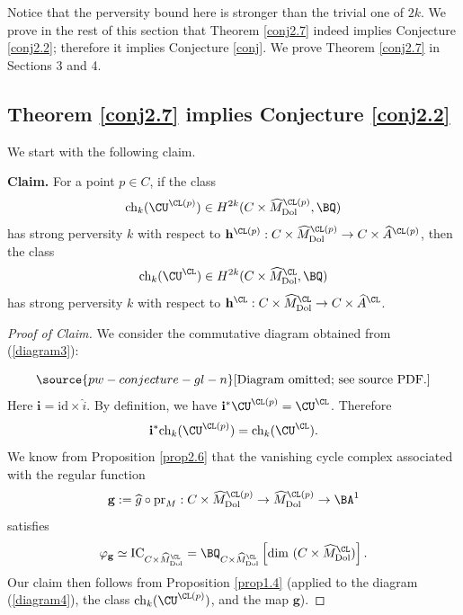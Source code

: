 Notice that the perversity bound here is stronger than the trivial one of $2k$.  We prove in the rest of this section that Theorem \ref{conj2.7} indeed implies Conjecture \ref{conj2.2}; therefore it implies Conjecture \ref{conj}. We prove Theorem \ref{conj2.7} in Sections 3 and 4.


\subsection{Theorem \ref{conj2.7} implies Conjecture \ref{conj2.2}}\label{Sec2.3} We start with the following claim.



 {\bf Claim.} For a point $p\in C$, if the class
\[
\mathrm{ch}_k(\CU^{\CL(p)}) \in H^{2k}(C\times \widehat{M}^{\CL(p)}_{\mathrm{Dol}}, \BQ)
\]
has strong perversity $k$ with respect to $\mathbf{h}^{\CL(p)}: C\times \widehat{M}^{\CL(p)}_{\mathrm{Dol}} \to C\times \widehat{A}^{\CL(p)}$, then the class
\[
\mathrm{ch}_k(\CU^{\CL}) \in H^{2k}(C\times \widehat{M}^{\CL}_{\mathrm{Dol}}, \BQ)
\]
has strong perversity $k$ with respect to $\mathbf{h}^{\CL}: C\times \widehat{M}^\CL_{\mathrm{Dol}} \to C\times \widehat{A}^\CL$.

\begin{proof}[Proof of Claim]

We consider the commutative diagram obtained from (\ref{diagram3}):

\begin{equation}\label{diagram4}
\source{pw-conjecture-gl-n}
\text{[Diagram omitted; see source PDF.]}
\end{equation}
Here $\mathbf{i} = \mathrm{id} \times \widehat{i}$. By definition,  we have $\mathbf{i}^* \CU^{\CL(p)} = \CU^{\CL}$. Therefore
\[
\mathbf{i}^* \mathrm{ch}_k(\CU^{\CL(p)}) = \mathrm{ch}_k(\CU^\CL).
\]
We know from Proposition \ref{prop2.6} that the vanishing cycle complex associated with the regular function
\[
\mathbf{g}: =  \widehat{g} \circ \mathrm{pr}_M: C\times \widehat{M}^{\CL(p)}_{\mathrm{Dol}} \to\widehat{M}^{\CL(p)}_{\mathrm{Dol}}\to \BA^1
\]
satisfies
\[
\varphi_{\mathbf{g}} \simeq \mathrm{IC}_{C\times \widehat{M}^{\CL}_{\mathrm{Dol}}} = {\BQ}_{C\times \widehat{M}^{\CL}_{\mathrm{Dol}}}\left[\mathrm{dim}~ (C\times \widehat{M}^{\CL}_{\mathrm{Dol}})\right].
\]
Our claim then follows from Proposition \ref{prop1.4} (applied to the diagram (\ref{diagram4}), the class $\mathrm{ch}_k(\CU^{\CL(p)})$, and the map $\mathbf{g}$).
\end{proof}

